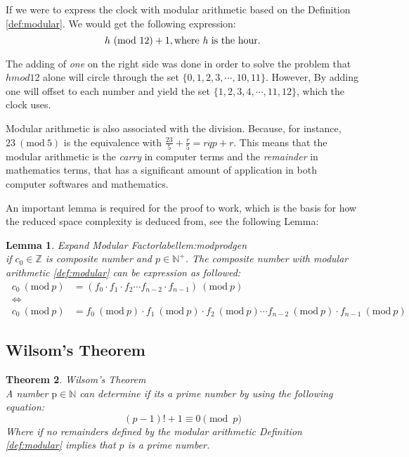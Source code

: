 \documentclass[12pt, oneside, onecolumn]{article}
\newtheorem{theorem}{Theorem}[section]
\newtheorem{lemma}[theorem]{Lemma}
\newcommand{\Mod}[1]{\ (\mathrm{mod}\ #1)}
\begin{document}
If we were to express the clock with modular arithmetic based on the Definition \ref{def:modular}. We would get the following expression:
\begin{equation}\label{equ:clock}
h\Mod{12} + 1, \text{where \emph{h} is the hour.}
\end{equation}

The adding of \emph{one} on the right side was done in order to solve the problem that $h mod 12$ alone will circle through the set $\{0,1,2,3,\cdots,10,11\}$. However, By adding one will offset to each number and yield the set $\{1,2,3,4,\cdots,11,12\}$, which the clock uses.

%
Modular arithmetic is also associated with the division. Because, for instance, $23\Mod{5}$ is the equivalence with $\frac{23}{5} + \frac{r}{5} = rqp + r$. This means that the modular arithmetic is the \emph{carry} in computer terms and the \emph{remainder} in mathematics terms, that has a significant amount of application in both computer softwares and mathematics.

%
An important lemma is required for the proof to work, which is the basis for how the reduced space complexity is deduced from, see the following Lemma:
\begin{lemma}{Expand Modular Factor}label{lem:modprodgen}
\\
if $c_0 \in \mathbb{Z}$ is composite number and $p \in \mathbb{N}^{+}$. The composite number with modular arithmetic \ref{def:modular} can be expression as followed:
\begin{equation}\
\begin{split}
c_0 \Mod{p} &= (f_0 \cdot f_1 \cdot f_2 \cdots f_{n-2} \cdot f_{n-1} ) \Mod{p} \\
\iff \\
c_0 \Mod{p} &= f_0 \Mod{p} \cdot f_1 \Mod{p} \cdot f_2 \Mod{p} \cdots f_{n-2} \Mod{p} \cdot f_{n-1} \Mod{p}
\end{split}
\end{equation}
\end{lemma}

\subsection{Wilsom's Theorem}

\begin{theorem}{Wilsom's Theorem}\label{the:wilsomprime}
\\
A number $\text{p} \in \mathbb{N}$ can determine if its a prime number by using the following equation:
\begin{equation}
(p - 1)! + 1 \equiv 0\pmod p
\end{equation}
Where if no remainders defined by the modular arithmetic Definition \ref{def:modular} implies that $p$ is a prime number.
\end{theorem}
\end{document}
